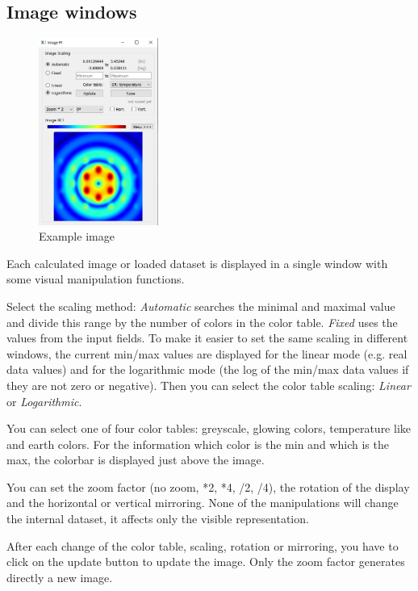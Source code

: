 \documentclass[11pt]{article} %
\begin{document}
\subsection{Image windows}

\begin{figure}
  \begin{center}
    \includegraphics[width=0.35\textwidth]{img-bct.png}
  \end{center}
 \caption{Example image}
\end{figure}
Each calculated image or loaded dataset is displayed in a single window with some visual manipulation functions.

Select the scaling method: {\it Automatic} searches the minimal and maximal value and divide this range by the number of colors in the color table. {\it Fixed} uses the values from the input fields. To make it easier to set the same scaling in different windows, the current min/max values are displayed for the linear mode (e.g. real data values) and for the logarithmic mode (the log of the min/max data values if they are not zero or negative). Then you can select the color table scaling: {\it Linear} or {\it Logarithmic}.

You can select one of four color tables: greyscale, glowing colors, temperature like and earth colors. For the information which color is the min and which is the max, the colorbar is displayed just above the image.

You can set the zoom factor (no zoom, *2, *4, /2, /4), the rotation of the display and the horizontal or vertical mirroring. None of the manipulations will change the internal dataset, it affects only the visible representation.

After each change of the color table, scaling, rotation or mirroring, you have to click on the update button to update the image. Only the zoom factor generates directly a new image.
\end{document}
